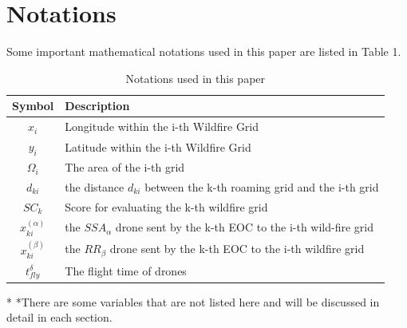 \documentclass[12pt]{article}  %
\begin{document}
\section{Notations}
Some important mathematical notations used in this paper are listed in Table 1.
\begin{table}[htbp]
    \begin{center}
        \caption{Notations used in this paper}
        \begin{tabular}{c l}
            \toprule[2pt]
            \multicolumn{1}{m{3cm}}{\centering Symbol}
                                  & \multicolumn{1}{m{8cm}}{\centering Description }                       \\
            \midrule
            $x_i$                 & Longitude within the i-th Wildfire Grid                                \\
            $y_i$                 & Latitude within the i-th Wildfire Grid                                 \\
            $\varOmega _i$        & The area of the i-th grid                                              \\
            $d_{ki}$              & the distance $d_{ki}$ between the k-th roaming grid and the i-th grid  \\
            $SC_k$                & Score for evaluating the k-th wildfire grid                            \\
            \vspace{5pt}%
            $x^{( \alpha )}_{ki}$ & the $SSA_\alpha$ drone sent by the k-th EOC to the i-th wild-fire grid \\
            \vspace{3pt}
            $x^{( \beta )}_{ki}$  & the $RR_\beta$ drone sent by the k-th EOC to the i-th wildfire grid    \\
            $t_{fly}^{\delta}$    & The flight time of drones                                              \\
            \bottomrule[2pt]
        \end{tabular}\label{tb:notation}
        \begin{tablenotes}
            \footnotesize
            \item[*] *There are some variables that are not listed here and will be discussed in detail in each section. %
        \end{tablenotes}
    \end{center}
\end{table}
\vspace{-1cm}%
\end{document}
